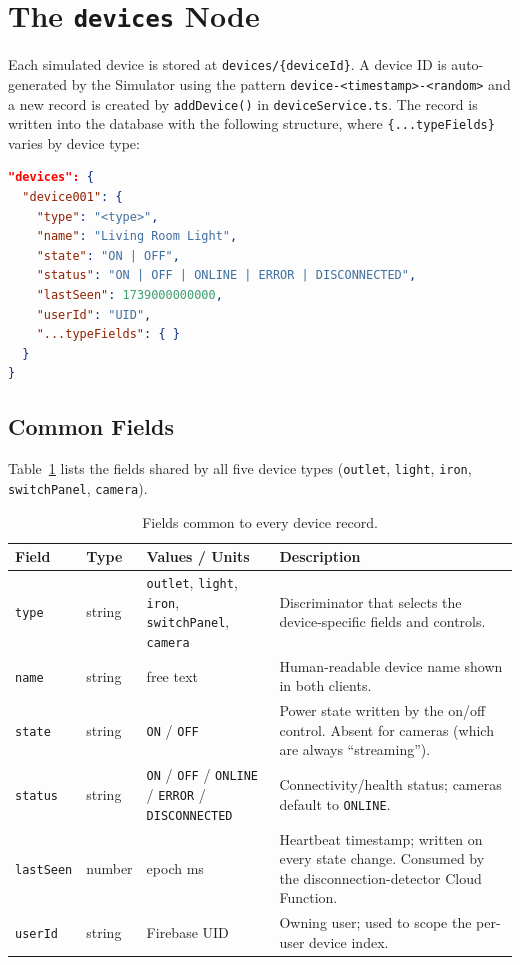 \documentclass[11pt,a4paper]{article}
\begin{document}
\section{The \texttt{devices} Node}
\label{sec:devices}

Each simulated device is stored at \texttt{devices/\{deviceId\}}. A device ID is auto-generated by
the Simulator using the pattern \texttt{device-<timestamp>-<random>} and a new record is created by
\texttt{addDevice()} in \texttt{deviceService.ts}. The record is written into the database with the
following structure, where \texttt{\{...typeFields\}} varies by device type:

\begin{lstlisting}[language=json,caption={Generic shape of a device record.},label={lst:device-generic}]
"devices": {
  "device001": {
    "type": "<type>",
    "name": "Living Room Light",
    "state": "ON | OFF",
    "status": "ON | OFF | ONLINE | ERROR | DISCONNECTED",
    "lastSeen": 1739000000000,
    "userId": "UID",
    "...typeFields": { }
  }
}
\end{lstlisting}

\subsection{Common Fields}
\label{sub:common}

Table~\ref{tab:common-fields} lists the fields shared by all five device types
(\texttt{outlet}, \texttt{light}, \texttt{iron}, \texttt{switchPanel}, \texttt{camera}).

\begin{table}[H]
\centering
\caption{Fields common to every device record.}
\label{tab:common-fields}
\begin{tabularx}{\textwidth}{@{}l l X X@{}}
\toprule
\textbf{Field} & \textbf{Type} & \textbf{Values / Units} & \textbf{Description} \\
\midrule
\texttt{type} & string & \texttt{outlet}, \texttt{light}, \texttt{iron}, \texttt{switchPanel}, \texttt{camera} & Discriminator that selects the device-specific fields and controls. \\
\texttt{name} & string & free text & Human-readable device name shown in both clients. \\
\texttt{state} & string & \texttt{ON} / \texttt{OFF} & Power state written by the on/off control. Absent for cameras (which are always ``streaming''). \\
\texttt{status} & string & \texttt{ON} / \texttt{OFF} / \texttt{ONLINE} / \texttt{ERROR} / \texttt{DISCONNECTED} & Connectivity/health status; cameras default to \texttt{ONLINE}. \\
\texttt{lastSeen} & number & epoch ms & Heartbeat timestamp; written on every state change. Consumed by the disconnection-detector Cloud Function. \\
\texttt{userId} & string & Firebase UID & Owning user; used to scope the per-user device index. \\
\bottomrule
\end{tabularx}
\end{table}
\end{document}
